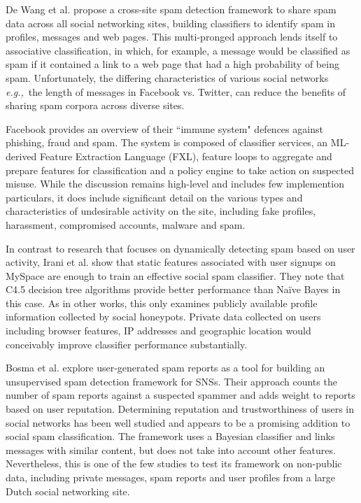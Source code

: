 \documentclass[preprint]{acm_proc_article-sp}
\newcommand{\eg}{{\em e.g.,}~}
\begin{document}
De Wang et al. \cite{wang} propose a cross-site spam detection framework to share 
spam data across all social networking sites, building classifiers to identify spam 
in profiles, messages and web pages. This multi-pronged approach lends itself to 
associative classification, in which, for example, a message would be classified as 
spam if it contained a link to a web page that had a high probability of being spam. 
Unfortunately, the differing characteristics of various social networks \eg the length 
of messages in Facebook vs. Twitter, can reduce the benefits of sharing spam corpora across diverse sites.

Facebook \cite{stein} provides an overview of their ``immune system" defences 
against phishing, fraud and spam. The system is composed of classifier services, an 
ML-derived Feature Extraction Language (FXL), feature loops to aggregate and prepare 
features for classification and a policy engine to take action on suspected misuse. While 
the discussion remains high-level and includes few implemention particulars, it does 
include significant detail on the various types and characteristics of undesirable 
activity on the site, including fake profiles, harassment, compromised accounts, malware and spam. 

In contrast to research that focuses on dynamically detecting spam based on user 
activity, Irani et al. \cite{irani} show that static features associated with user signups 
on MySpace are enough to train an effective social spam classifier. They note that
C4.5 decision tree algorithms provide better performance than Na\"ive Bayes in this case. 
As in other works, this only examines publicly available profile information collected 
by social honeypots. Private data collected on users including browser features, IP addresses 
and geographic location would conceivably improve classifier performance substantially.

Bosma et al. \cite{bosma} explore user-generated spam reports as a tool for building an unsupervised 
spam detection framework for SNSs. Their approach counts the number of spam reports against a 
suspected spammer and adds weight to reports based on user reputation. Determining reputation 
and trustworthiness of users in social networks has been well studied \cite{bian, guha, zhang} 
and appears to be a promising addition to social spam classification. The framework uses a 
Bayesian classifier and links messages with similar content, but does not take into account 
other features. Nevertheless, this is one of the few studies to test its framework on 
non-public data, including private messages, spam reports and user profiles from a 
large Dutch social networking site.
\end{document}
